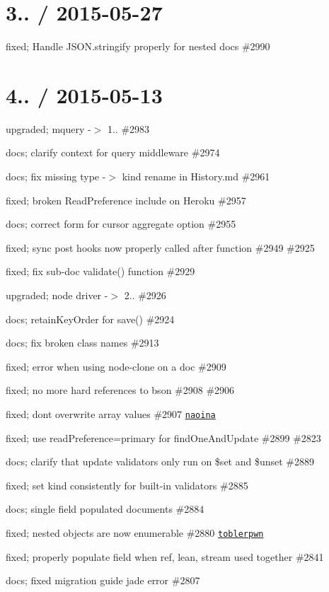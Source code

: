 \section*{3.. / 2015-\/05-\/27 }


\begin{DoxyItemize}
\item fixed; Handle J\+S\+O\+N.\+stringify properly for nested docs \#2990
\end{DoxyItemize}

\section*{4.. / 2015-\/05-\/13 }


\begin{DoxyItemize}
\item upgraded; mquery -\/$>$ 1.. \#2983
\item docs; clarify context for query middleware \#2974
\item docs; fix missing type -\/$>$ kind rename in History.\+md \#2961
\item fixed; broken Read\+Preference include on Heroku \#2957
\item docs; correct form for cursor aggregate option \#2955
\item fixed; sync post hooks now properly called after function \#2949 \#2925
\item fixed; fix sub-\/doc validate() function \#2929
\item upgraded; node driver -\/$>$ 2.. \#2926
\item docs; retain\+Key\+Order for save() \#2924
\item docs; fix broken class names \#2913
\item fixed; error when using node-\/clone on a doc \#2909
\item fixed; no more hard references to bson \#2908 \#2906
\item fixed; dont overwrite array values \#2907 \href{https://github.com/naoina}{\tt naoina}
\item fixed; use read\+Preference=primary for find\+One\+And\+Update \#2899 \#2823
\item docs; clarify that update validators only run on \$set and \$unset \#2889
\item fixed; set kind consistently for built-\/in validators \#2885
\item docs; single field populated documents \#2884
\item fixed; nested objects are now enumerable \#2880 \href{https://github.com/toblerpwn}{\tt toblerpwn}
\item fixed; properly populate field when ref, lean, stream used together \#2841
\item docs; fixed migration guide jade error \#2807
\end{DoxyItemize}

